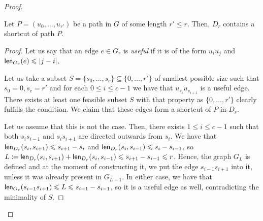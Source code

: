 \begin{proof}
	\begin{claim}\label{cl:shortcuts}
		Let $P=(u_0, \ldots, u_{r'})$ be a path in $G$ of some length $r' \le r$. Then, $D_r$ contains a shortcut of path $P$. 
	\end{claim}
%		
	\begin{proof}
		Let us say that an edge $e \in G_r$ is \emph{useful} if it is of the form $u_{i}u_{j}$ and $\mathsf{len}_{G_r}(e) \leqslant |j-i|$. 
		
		Let us take a subset
		$S=\{s_0, \ldots, s_c\} \subseteq \{0, \ldots, r'\}$ of smallest
		possible size such that $s_0=0, s_c=r'$ and for each $0 \le i \le c-1$ we have that $u_{s_i}u_{s_{i+1}}$ is a useful edge. There exists at least one feasible subset $S$ with that property as $\{0, \ldots, r'\}$ clearly fulfills the condition. We claim that these edges form a shortcut of $P$ in $D_r$.
		
		Let us assume that this is not the case. Then, there exists $1 \le i \le c-1$ such that both $s_{i}s_{i-1}$ and $s_is_{i+1}$ are directed outwards from $s_i$. We have that $\mathsf{len}_{D_r}(s_i, s_{i+1}) \leqslant s_{i+1}-s_i$ and $\mathsf{len}_{D_r}(s_i, s_{i-1}) \leqslant s_i - s_{i-1}$, so $L \coloneqq \mathsf{len}_{D_r}(s_i, s_{i+1})+\mathsf{len}_{D_r}(s_i, s_{i-1}) \leqslant s_{i+1}-s_{i-1} \leqslant r$.
	Hence, the graph $G_L$ is defined and at the moment of constructing it, we put the edge $s_{i-1}s_{i+1}$ into it, unless it was already present in $G_{L-1}$. In either case, we have that $\mathsf{len}_{G_r}(s_{i-1}s_{i+1}) \leqslant L \leqslant s_{i+1}-s_{i-1}$, so it is a useful edge as well, contradicting the minimality of $S$. 
	\end{proof}
	

\end{proof}

